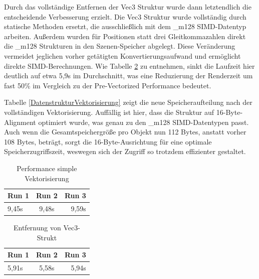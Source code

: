 \documentclass[sigconf]{acmart}
\begin{document}
Durch das vollständige Entfernen der Vec3 Struktur wurde dann letztendlich die entscheidende Verbesserung erzielt.
Die Vec3 Struktur wurde vollständig durch statische Methoden ersetzt, die ausschließlich mit dem \_m128 SIMD-Datentyp arbeiten. Außerdem wurden für Positionen statt drei Gleitkommazahlen direkt die \_m128 Strukturen in den Szenen-Speicher abgelegt.
Diese Veränderung vermeidet jeglichen vorher getätigten Konvertierungsaufwand und ermöglicht direkte SIMD-Berechnungen.
Wie Tabelle \ref{EliminationVec3Struct} zu entnehmen, sinkt die Laufzeit hier deutlich auf etwa 5,9s im Durchschnitt, was eine Reduzierung der Renderzeit um fast 50\% im Vergleich zu der Pre-Vectorized Performance bedeutet.

Tabelle \ref{DatenstrukturVektorisierung} zeigt die neue Speicheraufteilung nach der vollständigen Vektorisierung.
Auffällig ist hier, dass die Struktur auf 16-Byte-Alignment optimiert wurde, was genau zu den \_m128 SIMD-Datentypen passt.
Auch wenn die Gesamtspeichergröße pro Objekt nun 112 Bytes, anstatt vorher 108 Bytes, beträgt, sorgt die 16-Byte-Ausrichtung für eine optimale Speicherzugriffszeit, weswegen sich der Zugriff so trotzdem effizienter gestaltet.

\begin{table}[t]
    \caption{Performance simple Vektorisierung}
   
    \label{SimpleVectorization}
    \centering
    \small
    \begin{tabular}[h]{lcr}
        \toprule
        Run 1 & Run 2 & Run 3\\
        \midrule
         9,45s & 9,48s & 9,59s\\
         \bottomrule
    \end{tabular}
\end{table}

\begin{table}[b]
    \caption{Entfernung von Vec3-Strukt}
   
    \label{EliminationVec3Struct}
    \centering
    \small
    \begin{tabular}[h]{lcr}
        \toprule
        Run 1 & Run 2 & Run 3\\
        \midrule
         5,91s & 5,58s & 5,94s\\
         \bottomrule
    \end{tabular}
\end{table}
\end{document}
